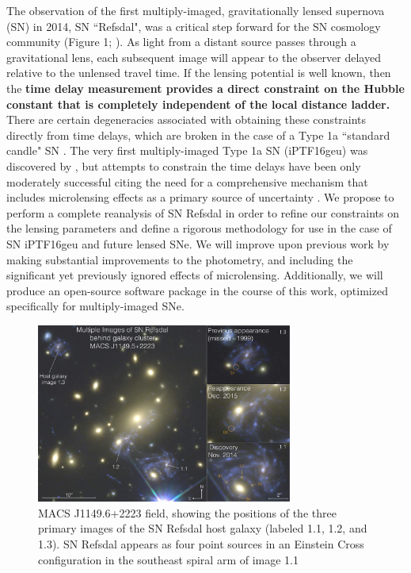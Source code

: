 \forceindent The observation of the first multiply-imaged, gravitationally lensed supernova (SN) in 2014, SN ``Refsdal", 
was a critical step forward for the SN cosmology community (Figure 1; \citet{Kelly:2015a}). As light from a distant
source passes through a gravitational lens, each subsequent image will appear to the observer delayed relative to the 
unlensed travel time. If the lensing potential is well known, then the {\bf time delay measurement  provides a direct constraint on
the Hubble constant that is completely independent of the local distance ladder.} There are certain degeneracies associated with
obtaining these constraints directly from time delays, which are broken in the case of a Type 1a ``standard candle" SN \citep{Kolatt:1998}. The very 
first multiply-imaged Type 1a SN (iPTF16geu) was discovered by \citet{Goobar:2016}, but attempts to constrain the time delays have been 
only moderately successful citing the need for a comprehensive mechanism that includes microlensing effects as a primary source of uncertainty 
\citep{More:2016}. We propose to perform a complete reanalysis of SN Refsdal in order to refine our constraints on the lensing parameters 
and define a rigorous methodology for use in the case of SN iPTF16geu and future lensed SNe. We will improve upon previous work by 
making substantial improvements to the photometry, and including the significant yet previously ignored effects of microlensing. 
Additionally, we will produce an open-source software package in the course of this work, optimized specifically for multiply-imaged SNe. 

\begin{figure}[h]
\centering
\includegraphics[width=0.75\textwidth]{FIG/refsdal_rodney.pdf}
\caption{
MACS J1149.6+2223 field, showing the positions of the three primary
images of the SN Refsdal host galaxy (labeled 1.1, 1.2, and 1.3). SN
Refsdal appears as four point sources in an Einstein Cross
configuration in the southeast spiral arm of image 1.1 \citep{Rodney:2016}}
\end{figure}

